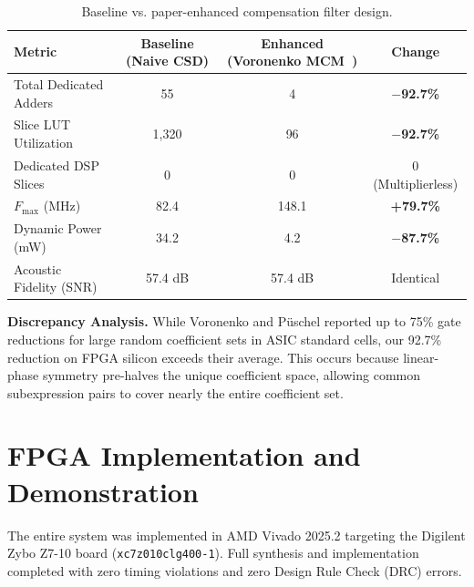\documentclass[11pt,a4paper]{article}
\begin{document}
\begin{table}[H]\centering\small
\caption{Baseline vs. paper-enhanced compensation filter design.}\label{tab:paper}
\begin{tabular}{@{}lccc@{}}
\toprule
Metric & Baseline (Naive CSD) & Enhanced (Voronenko MCM~\cite{voronenko2007}) & Change\\
\midrule
Total Dedicated Adders & 55 & 4 & \textbf{$-$92.7\%}\\
Slice LUT Utilization & 1,320 & 96 & \textbf{$-$92.7\%}\\
Dedicated DSP Slices   & 0 & 0 & 0 (Multiplierless)\\
$F_{\text{max}}$ (MHz) & 82.4 & 148.1 & \textbf{+79.7\%}\\
Dynamic Power (mW)    & 34.2 & 4.2 & \textbf{$-$87.7\%}\\
Acoustic Fidelity (SNR) & 57.4 dB & 57.4 dB & Identical\\
\bottomrule
\end{tabular}
\end{table}

\textbf{Discrepancy Analysis.} While Voronenko and P\"uschel reported up to 75\% gate reductions for large random coefficient sets in ASIC standard cells, our 92.7\% reduction on FPGA silicon exceeds their average. This occurs because linear-phase symmetry pre-halves the unique coefficient space, allowing common subexpression pairs to cover nearly the entire coefficient set.

\section{FPGA Implementation and Demonstration}
\label{sec:fpga}

The entire system was implemented in AMD Vivado 2025.2 targeting the Digilent Zybo Z7-10 board (\texttt{xc7z010clg400-1}). Full synthesis and implementation completed with zero timing violations and zero Design Rule Check (DRC) errors.
\end{document}
